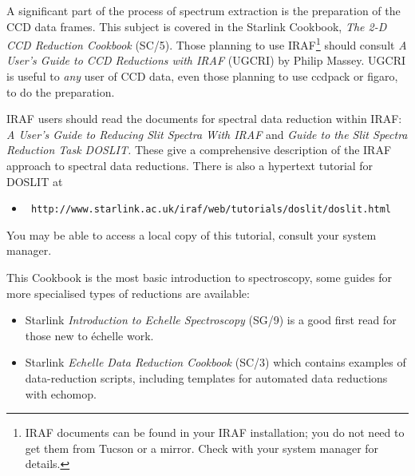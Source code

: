 \documentclass[twoside,11pt]{article}
\newcommand{\htmladdnormallink}[2]{#1}
\newcommand{\htmlref}[2]{#1}
\newcommand{\xref}[3]{#1}
\newcommand{\scspec}[2]{#1}
\newcommand{\scspec}[2]{#2}
\begin{document}
A significant part of the process of spectrum extraction
is the preparation of the \htmlref{CCD}{gl_ccd} data frames.
This subject is covered in the Starlink Cookbook,
\xref{{\sl The 2-D CCD Reduction Cookbook} (SC/5)}{sc5}{}.
Those planning to use
\htmladdnormallink{IRAF}
{http://www.starlink.ac.uk/iraf/web/iraf-homepage.html}\scspec{\footnote{IRAF
documents can be found in your IRAF installation; you
do not need to get them from Tucson or a mirror.  Check with your
system manager for
details.}}{{\bf (All IRAF-related hyperlinks in this document are to the
UK-based Starlink IRAF mirror except \htmladdnormallink{this one}
{http://iraf.noao.edu/} which goes to the Tucson site.)}} should consult
\htmladdnormallink{{\sl A User's Guide to CCD Reductions with IRAF}}
{ftp://starlink-ftp.rl.ac.uk/pub/iraf/iraf/docs/ccduser2.ps.Z} (UGCRI) by
Philip Massey.
UGCRI is useful to {\em any} user of CCD data, even those
planning to use \xref{{\sc ccdpack}}{sun139}{}\cite{ccdpack} or
\xref{{\sc figaro}}{sun86}{}\cite{figaro}, to do the preparation.

IRAF users should read the documents for spectral data reduction
within IRAF:
\htmladdnormallink{{\sl A User's Guide to Reducing Slit Spectra With IRAF}}
{ftp://starlink-ftp.rl.ac.uk/pub/iraf/iraf/docs/spect.ps.Z}
and
\htmladdnormallink{{\sl Guide to the Slit Spectra Reduction Task DOSLIT\@.}}
{ftp://starlink-ftp.rl.ac.uk/pub/iraf/iraf/docs/doslit.ps.Z}
These give a comprehensive description of the IRAF approach to spectral
data reductions.  There is also a hypertext tutorial for DOSLIT at

\begin{itemize}

\item \htmladdnormallink{{\tt
      http://www.starlink.ac.uk/iraf/web/tutorials/doslit/doslit.html}}
      {http://www.starlink.ac.uk/iraf/web/tutorials/doslit/doslit.html}

\end{itemize}

You may be able to access a local copy of this tutorial, consult your
system manager.

This Cookbook is the most basic introduction to spectroscopy, some
guides for more specialised types of reductions are available:

\begin{itemize}

\item Starlink \xref{{\sl Introduction to Echelle Spectroscopy}
(SG/9)}{sg9}{} is a good first read for those new to
\'{e}chelle work.

\item Starlink \xref{{\sl Echelle Data Reduction Cookbook}
(SC/3)}{sc3}{} which contains examples of
data-reduction scripts, including templates for automated data
reductions with \xref{{\sc echomop}}{sun152}{}\cite{echomop}\@.

\end{itemize}
\end{document}
